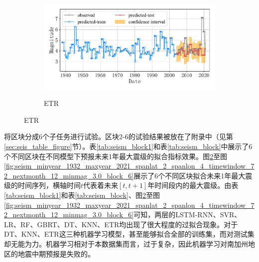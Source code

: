 \begin{figure}[!htbp]
\begin{subfigure}[b]{0.45\textwidth}
  \end{subfigure}
  ~
  \begin{subfigure}[b]{0.45\textwidth}
    \caption{ETR}
    \vspace{-0.2cm}
    \includegraphics[width=\textwidth]{Img/chap5_seism/block1/seism_etr_minyear_1932_maxyear_2021_spanlat_2_spanlon_4_timewindow_72_nextmonth_12_minmag_3.0_block_1.pdf}
    \vspace{-1cm}
    \label{fig:seism_etr_minyear_1932_maxyear_2021_spanlat_2_spanlon_4_timewindow_72_nextmonth_12_minmag_3.0_block_1}
  \end{subfigure}
  \label{fig:seism_minyear_1932_maxyear_2021_spanlat_2_spanlon_4_timewindow_72_nextmonth_12_minmag_3.0_block_1}
\end{figure}

将区块分成6个子任务进行试验。区块2-6的试验结果被放在了附录中（见第\ref{sec:seis_table_figure}节）。表\ref{tab:seism_block1}和表\ref{tab:seism_block}中展示了6个不同区块在不同模型下预报未来1年最大震级的拟合指标效果。图\ref{fig:seism_minyear_1932_maxyear_2021_spanlat_2_spanlon_4_timewindow_72_nextmonth_12_minmag_3.0_block_1}至图\ref{fig:seism_minyear_1932_maxyear_2021_spanlat_2_spanlon_4_timewindow_72_nextmonth_12_minmag_3.0_block_6}展示了6个不同区块拟合未来1年最大震级的时间序列，横轴时间$t$代表着未来$[t,t+1]$年时间段内的最大震级。由表\ref{tab:seism_block1}和表\ref{tab:seism_block}、图\ref{fig:seism_minyear_1932_maxyear_2021_spanlat_2_spanlon_4_timewindow_72_nextmonth_12_minmag_3.0_block_1}至图\ref{fig:seism_minyear_1932_maxyear_2021_spanlat_2_spanlon_4_timewindow_72_nextmonth_12_minmag_3.0_block_6}可知，两层的LSTM-RNN、SVR、LR、RF、GBRT、DT、KNN、ETR均出现了很大程度的过拟合现象。对于DT、KNN、ETR这三种机器学习模型，甚至能够拟合全部的训练集，而对测试集却无能为力。机器学习相对于本数据集而言，过于复杂，因此机器学习对南加州地区的地震中期预报是失败的。

